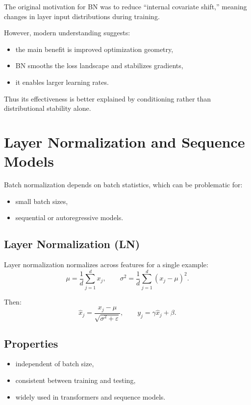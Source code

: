 The original motivation for BN was to reduce ``internal covariate shift,'' meaning changes in layer input distributions during training.

However, modern understanding suggests:
\begin{itemize}
    \item the main benefit is improved optimization geometry,
    \item BN smooths the loss landscape and stabilizes gradients,
    \item it enables larger learning rates.
\end{itemize}

Thus its effectiveness is better explained by conditioning rather than distributional stability alone.

\section{Layer Normalization and Sequence Models}

Batch normalization depends on batch statistics, which can be problematic for:
\begin{itemize}
    \item small batch sizes,
    \item sequential or autoregressive models.
\end{itemize}

\subsection{Layer Normalization (LN)}

Layer normalization normalizes across features for a single example:
\[
\mu = \frac{1}{d}\sum_{j=1}^d x_j,
\qquad
\sigma^2 = \frac{1}{d}\sum_{j=1}^d (x_j - \mu)^2.
\]

Then:
\[
\hat{x}_j = \frac{x_j - \mu}{\sqrt{\sigma^2 + \varepsilon}},
\qquad
y_j = \gamma \hat{x}_j + \beta.
\]

\subsection{Properties}

\begin{itemize}
    \item independent of batch size,
    \item consistent between training and testing,
    \item widely used in transformers and sequence models.
\end{itemize}

